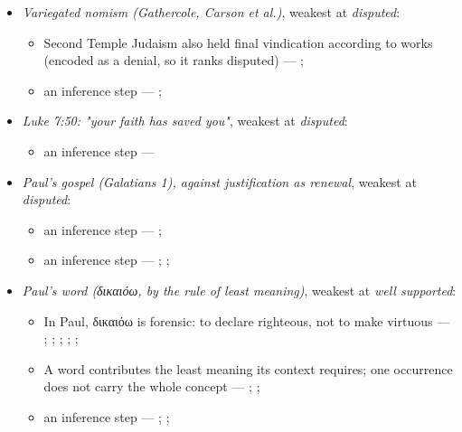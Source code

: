 \documentclass[11pt]{article}
\begin{document}
\begin{itemize}
\begin{itemize}
\item an inference step --- \cite[Trent, Session VI (1547), canon 9]{tanner-decrees-1990}
\end{itemize}
\item \emph{Variegated nomism (Gathercole, Carson et al.)}, weakest at \emph{disputed}:
\begin{itemize}
\item Second Temple Judaism also held final vindication according to works (encoded as a denial, so it ranks disputed) --- \cite{gathercole-where-boasting-2002}; \cite{carson-variegated-nomism-1-2001}
\item an inference step --- \cite{gathercole-where-boasting-2002}; \cite{carson-variegated-nomism-1-2001}
\end{itemize}
\item \emph{Luke 7:50: "your faith has saved you"}, weakest at \emph{disputed}:
\begin{itemize}
\item an inference step --- \cite[Trent, Session VI (1547), canon 9]{tanner-decrees-1990}
\end{itemize}
\item \emph{Paul's gospel (Galatians 1), against justification as renewal}, weakest at \emph{disputed}:
\begin{itemize}
\item an inference step --- \cite[ad loc. Gal 1:6]{moo-galatians-2013}; \cite[XI.1]{westminster-confession-1647}
\item an inference step --- \cite[XI.1]{westminster-confession-1647}; \cite[III.xi.2]{calvin-institutes-1960}; \cite{morris-apostolic-preaching-1965}
\end{itemize}
\item \emph{Paul's word (δικαιόω, by the rule of least meaning)}, weakest at \emph{well supported}:
\begin{itemize}
\item In Paul, δικαιόω is forensic: to declare righteous, not to make virtuous --- \cite[s.v. δικαιόω]{bauer-danker-lexicon-2000}; \cite{morris-apostolic-preaching-1965}; \cite[p. 80]{moo-romans-1996}; \cite{irons-righteousness-of-god-2015}; \cite{wright-justification-2009}; \cite[ad loc. Rom 3:24]{fitzmyer-romans-1993}
\item A word contributes the least meaning its context requires; one occurrence does not carry the whole concept --- \cite{silva-biblical-words-1994}; \cite{joos-semantic-axiom-1972}; \cite{barr-semantics-2004}
\item an inference step --- \cite{silva-biblical-words-1994}; \cite[p. 80]{moo-romans-1996}; \cite{barr-semantics-2004}

\end{itemize}
\end{itemize}
\end{document}
